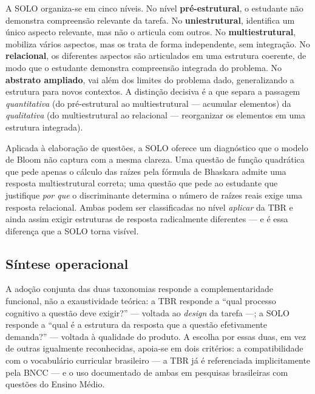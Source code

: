 A SOLO organiza-se em cinco níveis. No nível \textbf{pré-estrutural}, o estudante não demonstra
compreensão relevante da tarefa. No \textbf{uniestrutural}, identifica um único aspecto relevante, mas
não o articula com outros. No \textbf{multiestrutural}, mobiliza vários aspectos, mas os trata de forma
independente, sem integração. No \textbf{relacional}, os diferentes aspectos são articulados em uma
estrutura coerente, de modo que o estudante demonstra compreensão integrada do problema. No
\textbf{abstrato ampliado}, vai além dos limites do problema dado, generalizando a estrutura para novos
contextos. A distinção decisiva é a que separa a passagem \emph{quantitativa} (do pré-estrutural ao
multiestrutural --- acumular elementos) da \emph{qualitativa} (do multiestrutural ao relacional ---
reorganizar os elementos em uma estrutura integrada).

Aplicada à elaboração de questões, a SOLO oferece um diagnóstico que o modelo de Bloom não captura com
a mesma clareza. Uma questão de função quadrática que pede apenas o cálculo das raízes pela fórmula de
Bhaskara admite uma resposta multiestrutural correta; uma questão que pede ao estudante que justifique
\emph{por que} o discriminante determina o número de raízes reais exige uma resposta relacional. Ambas
podem ser classificadas no nível \emph{aplicar} da TBR e ainda assim exigir estruturas de resposta
radicalmente diferentes --- e é essa diferença que a SOLO torna visível.

\subsection{Síntese operacional}
\label{sub:sintese-tax}


A adoção conjunta das duas taxonomias responde a complementaridade funcional, não a exaustividade
teórica: a TBR responde a ``qual processo cognitivo a questão deve exigir?'' --- voltada ao \emph{design}
da tarefa ---; a SOLO responde a ``qual é a estrutura da resposta que a questão efetivamente
demanda?'' --- voltada à qualidade do produto. A escolha por essas duas, em vez de outras igualmente
reconhecidas, apoia-se em dois critérios: a compatibilidade com o vocabulário curricular brasileiro ---
a TBR já é referenciada implicitamente pela BNCC --- e o uso documentado de ambas em pesquisas
brasileiras com questões do Ensino Médio.

